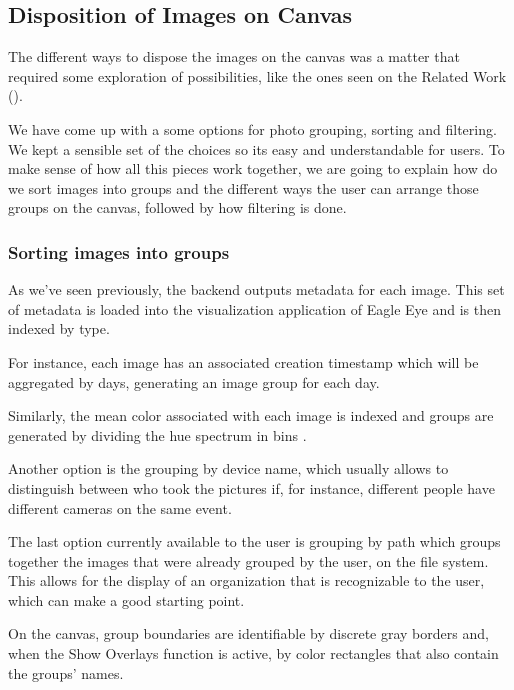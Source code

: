 \subsection{Disposition of Images on Canvas}
\label{sub:dispositions}

The different ways to dispose the images on the canvas was a matter that required some exploration of possibilities, like the ones seen on the Related Work (\cite{Bederson:2001:PZI:502348.502359,Bruls:2000p3517,Chen:1998p2344,Girgensohn:2010,Heesch:2004p2675,Hsu:2009p2696,Porta:2006p416,Rodden:2001p731,Schaefer:2010p1871,Strong:2009p413}).

We have come up with a some options for photo grouping, sorting and filtering. We kept a sensible set of the choices so its easy and understandable for users. 
To make sense of how all this pieces work together, we are going to explain how do we sort images into groups and the different ways the user can arrange those groups on the canvas, followed by how filtering is done.


\subsubsection{Sorting images into groups}

As we've seen previously, the backend outputs metadata for each image. This set of metadata is loaded into the visualization application of Eagle Eye and is then indexed by type.

For instance, each image has an associated creation timestamp which will be aggregated by days, generating an image group for each day.

Similarly, the mean color associated with each image is indexed and groups are generated by dividing the hue spectrum in bins .

Another option is the grouping by device name, which usually allows to distinguish between who took the pictures if, for instance, different people have different cameras on the same event.

The last option currently available to the user is grouping by path which groups together the images that were already grouped by the user, on the file system. This allows for the display of an organization that is recognizable to the user, which can make a good starting point.

On the canvas, group boundaries are identifiable by discrete gray borders and, when the Show Overlays function is active, by color rectangles that also contain the groups' names.


